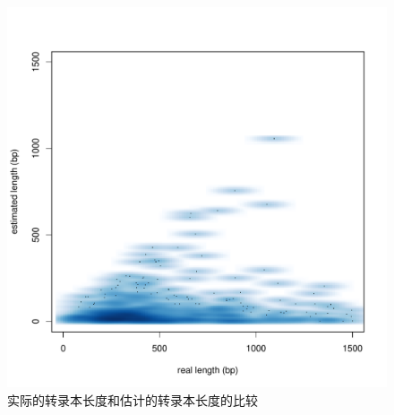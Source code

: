 \begin{figure}[!t]
\centering
\includegraphics[width=\textwidth]{figures/lenest/real-len-VS-est-len.pdf}
\caption{实际的转录本长度和估计的转录本长度的比较}
\label{real-len-VS-est-len}
\end{figure}



